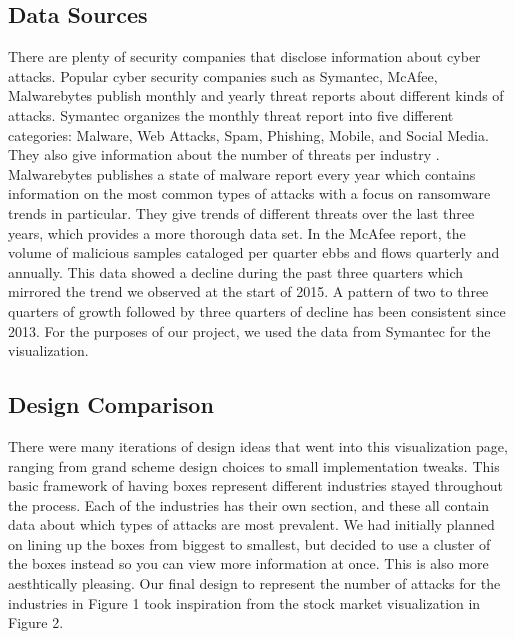 \documentclass[journal]{vgtc}                %
\begin{document}
\subsection{Data Sources}
There are plenty of security companies that disclose information about cyber attacks. 
Popular cyber security companies such as Symantec, McAfee, Malwarebytes publish monthly and yearly threat reports about different kinds of attacks. 
Symantec organizes the monthly threat report into five different categories: Malware, Web Attacks, Spam, Phishing, Mobile, and Social Media. 
They also give information about the number of threats per industry \cite{SMR}.
Malwarebytes publishes a state of malware report every year which contains information on the most common types of attacks with a focus on ransomware trends in particular. 
They give trends of different threats over the last three years, which provides a more thorough data set. \cite{MWB}
In the McAfee report, the volume of malicious samples cataloged per quarter ebbs and flows quarterly and annually. 
This data showed a decline during the past three quarters which mirrored the trend we observed at the start of 2015. 
A pattern of two to three quarters of growth followed by three quarters of decline has been consistent since 2013. \cite{QT17}
For the purposes of our project, we used the data from Symantec for the visualization.

\subsection{Design Comparison}
There were many iterations of design ideas that went into this visualization page, ranging from grand scheme design choices to small implementation tweaks.
This basic framework of having boxes represent different industries stayed throughout the process.
Each of the industries has their own section, and these all contain data about which types of attacks are most prevalent.
We had initially planned on lining up the boxes from biggest to smallest, but decided to use a cluster of the boxes instead so you can view more information at once.
This is also more aesthtically pleasing.
Our final design to represent the number of attacks for the industries in Figure 1 took inspiration from the stock market visualization in Figure 2.
\end{document}
